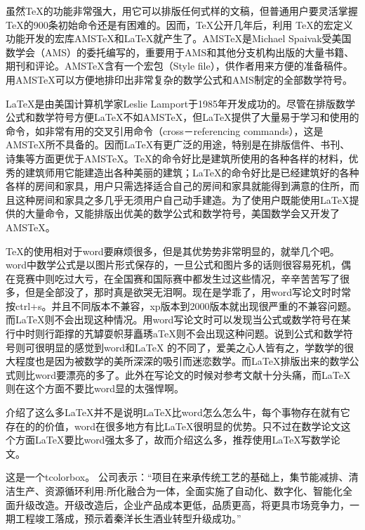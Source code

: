 \documentclass[UTF8,12pt,a4paper]{article}
\begin{document}
虽然TeX的功能非常强大，用它可以排版任何式样的文稿，但普通用户要灵活掌握TeX的900条初始命令还是有困难的。因而，TeX公开几年后，利用 TeX的宏定义功能开发的宏库AMSTeX和LaTeX就产生了。AMSTeX是Michael Spaivak受美国数学会（AMS）的委托编写的，重要用于AMS和其他分支机构出版的大量书籍、期刊和评论。AMSTeX含有一个宏包（Style file），供作者用来方便的准备稿件。用AMSTeX可以方便地排印出非常复杂的数学公式和AMS制定的全部数学符号。

LaTeX是由美国计算机学家Leslie Lamport于1985年开发成功的。尽管在排版数学公式和数学符号方便LaTeX不如AMSTeX，但LaTeX提供了大量易于学习和使用的命令，如非常有用的交叉引用命令（cross－referencing commands），这是AMSTeX所不具备的。因而LaTeX有更广泛的用途，特别是在排版信件、书刊、诗集等方面更优于AMSTeX。TeX的命令好比是建筑所使用的各种各样的材料，优秀的建筑师用它能建造出各种美丽的建筑；LaTeX的命令好比是已经建筑好的各种各样的房间和家具，用户只需选择适合自己的房间和家具就能得到满意的住所，而且这种房间和家具之多几乎无须用户自己动手建造。为了使用户既能使用LaTeX提供的大量命令，又能排版出优美的数学公式和数学符号，美国数学会又开发了AMSTeX。

TeX的使用相对于word要麻烦很多，但是其优势势非常明显的，就举几个吧。word中数学公式是以图片形式保存的，一旦公式和图片多的话则很容易死机，偶在竞赛中则吃过大亏，在全国赛和国际赛中都发生过这些情况，辛辛苦苦写了很多，但是全部没了，那时真是欲哭无泪啊。现在是学乖了，用word写论文时时常按ctrl+s。并且不同版本不兼容，xp版本到2000版本就出现很严重的不兼容问题。而LaTeX则不会出现这种情况。用word写论文时可以发现当公式或数学符号在某行中时则行距撑的艽罅耍帜芽矗琇aTeX则不会出现这种问题。说到公式和数学符号则可很明显的感觉到word和LaTeX 的不同了，爱美之心人皆有之，学数学的很大程度也是因为被数学的美所深深的吸引而迷恋数学。而LaTeX排版出来的数学公式则比word要漂亮的多了。此外在写论文的时候对参考文献十分头痛，而LaTeX则在这个方面不要比word显的太强悍啊。

介绍了这么多LaTeX并不是说明LaTeX比word怎么怎么牛，每个事物存在就有它存在的的价值，word在很多地方有比LaTeX很明显的优势。只不过在数学论文这个方面LaTeX要比word强太多了，故而介绍这么多，推荐使用LaTeX写数学论文。

\vspace{0.5em}\noindent%
\begin{tcolorbox}
	这是一个tcolorbox。
	公司表示：“项目在来承传统工艺的基础上，集节能减排、清洁生产、资源循环利用:所化融合为一体，全面实施了自动化、数字化、智能化全面升级改造。开级改造后，企业产品成本更低，品质更高，将更具市场竞争力，一期工程竣工落成，预示着秦洋长生酒业转型升级成功。”
\end{tcolorbox}
\end{document}
